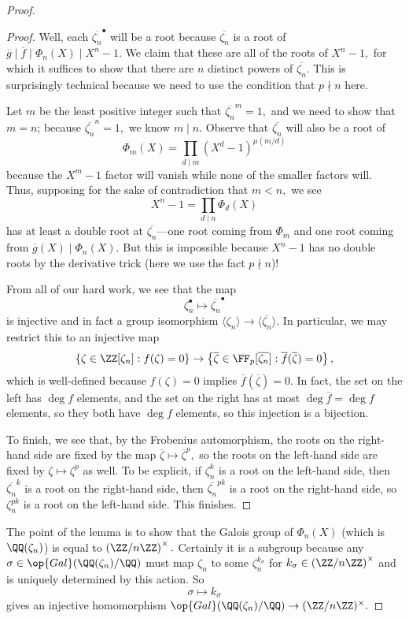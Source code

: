 \documentclass[../notes.tex]{subfiles}
\begin{document}
\begin{proof}
\begin{proof}
		Well, each $\overline{\zeta_n}^\bullet$ will be a root because $\overline{\zeta_n}$ is a root of $\overline g\mid\overline f\mid\Phi_n(X)\mid X^n-1.$ We claim that these are all of the roots of $X^n-1,$ for which it suffices to show that there are $n$ distinct powers of $\overline{\zeta_n}.$ This is surprisingly technical because we need to use the condition that $p\nmid n$ here.

		Let $m$ be the least positive integer such that $\overline{\zeta_n}^m=1,$ and we need to show that $m=n$; because $\overline{\zeta_n}^n=1,$ we know $m\mid n.$ Observe that $\overline{\zeta_n}$ will also be a root of
		\[\Phi_m(X)=\prod_{d\mid m}\left(X^d-1\right)^{\mu(m/d)}\]
		because the $X^m-1$ factor will vanish while none of the smaller factors will. Thus, supposing for the sake of contradiction that $m<n,$ we see
		\[X^n-1=\prod_{d\mid n}\Phi_d(X)\]
		has at least a double root at $\overline{\zeta_n}$---one root coming from $\Phi_m$ and one root coming from $\overline g(X)\mid\Phi_n(X).$ But this is impossible because $X^n-1$ has no double roots by the derivative trick (here we use the fact $p\nmid n$)!

		From all of our hard work, we see that the map
		\[\zeta_n^\bullet\mapsto\overline{\zeta_n}^\bullet\]
		is injective and in fact a group isomorphism $\langle\zeta_n\rangle\to\langle\overline{\zeta_n}\rangle.$ In particular, we may restrict this to an injective map
		\[\{\zeta\in\ZZ[\zeta_n]:f(\zeta)=0\}\to\left\{\overline\zeta\in\FF_p[\overline{\zeta_n}]:\overline f(\overline\zeta)=0\right\},\]
		which is well-defined because $f(\zeta)=0$ implies $\overline f(\overline\zeta)=0.$ In fact, the set on the left has $\deg f$ elements, and the set on the right has at most $\deg\overline f=\deg f$ elements, so they both have $\deg f$ elements, so this injection is a bijection.

		To finish, we see that, by the Frobenius automorphism, the roots on the right-hand side are fixed by the map $\overline\zeta\mapsto\overline\zeta^p,$ so the roots on the left-hand side are fixed by $\zeta\mapsto\zeta^p$ as well. To be explicit, if $\zeta_n^k$ is a root on the left-hand side, then $\overline{\zeta_n}^k$ is a root on the right-hand side, then $\overline{\zeta_n}^{pk}$ is a root on the right-hand side, so $\zeta_n^{pk}$ is a root on the left-hand side. This finishes.
	\end{proof}
	The point of the lemma is to show that the Galois group of $\Phi_n(X)$ (which is $\QQ(\zeta_n)$) is equal to $\left(\ZZ/n\ZZ\right)^\times.$ Certainly it is a subgroup because any $\sigma\in\op{Gal}(\QQ(\zeta_n)/\QQ)$ must map $\zeta_n$ to some $\zeta_n^{k_\sigma}$ for $k_\sigma\in\left(\ZZ/n\ZZ\right)^\times$ and is uniquely determined by this action. So
	\[\sigma\mapsto k_\sigma\]
	gives an injective homomorphism $\op{Gal}(\QQ(\zeta_n)/\QQ)\to(\ZZ/n\ZZ)^\times.$


\end{proof}
\end{document}
